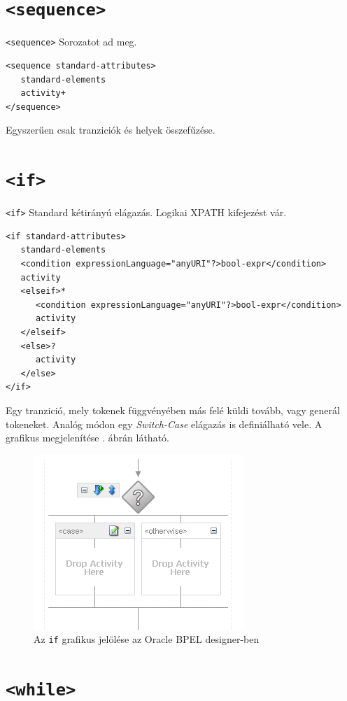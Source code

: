 \section{\texttt{<sequence>}}

\texttt{<sequence>} Sorozatot ad meg.
\begin{verbatim}
<sequence standard-attributes>
   standard-elements
   activity+
</sequence>
\end{verbatim}
Egyszerűen csak tranziciók és helyek összefűzése. 

\section{\texttt{<if>}}

\texttt{<if>} Standard kétirányú elágazás. Logikai XPATH kifejezést vár. 
\begin{verbatim}
<if standard-attributes>
   standard-elements
   <condition expressionLanguage="anyURI"?>bool-expr</condition>
   activity
   <elseif>*
      <condition expressionLanguage="anyURI"?>bool-expr</condition>
      activity
   </elseif>
   <else>?
      activity
   </else>
</if>
\end{verbatim}
Egy tranzició, mely tokenek függvényében más felé küldi tovább, vagy generál tokeneket. Analóg módon egy \textit{Switch-Case} elágazás is definiálható vele.
A grafikus megjelenítése . ábrán látható.

\begin{figure}[h!]
\centering
\includegraphics[scale=1]{images/if.png}
\caption{Az \texttt{if} grafikus jelölése az Oracle BPEL designer-ben}
\label{fig:if}
\end{figure}

\section{\texttt{<while>}}


